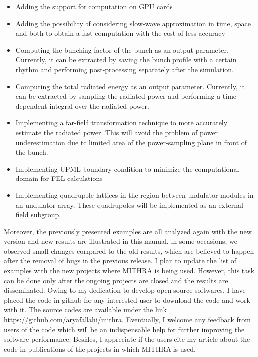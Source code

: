 \begin{itemize}
	\setlength{\parskip}{0pt}
	\setlength{\itemsep}{0pt plus 1pt}
	\item Adding the support for computation on GPU cards
	\item Adding the possibility of considering slow-wave approximation in time, space and both to obtain a fast computation with the cost of less accuracy
	\item Computing the bunching factor of the bunch as an output parameter. Currently, it can be extracted by saving the bunch profile with a certain rhythm and performing post-processing separately after the simulation.
	\item Computing the total radiated energy as an output parameter. Currently, it can be extracted by sampling the radiated power and performing a time-dependent integral over the radiated power.
	\item Implementing a far-field transformation technique to more accurately estimate the radiated power. This will avoid the problem of power underestimation due to limited area of the power-sampling plane
	 in front of the bunch.
	\item Implementing UPML boundary condition to minimize the computational domain for FEL calculations
	\item Implementing quadrupole lattices in the region between undulator modules in an undulator array. These quadrupoles will be implemented as an external field subgroup. 
\end{itemize}
%
Moreover, the previously presented examples are all analyzed again with the new version and new results are illustrated in this manual.
%
In some occasions, we observed small changes compared to the old results, which are believed to happen after the removal of bugs in the previous release.
%
I plan to update the list of examples with the new projects where MITHRA is being used.
%
However, this task can be done only after the ongoing projects are closed and the results are disseminated.
%
Owing to my dedication to develop open-source softwares, I have placed the code in github for any interested user to download the code and work with it.
%
The source codes are available under the link \href{https://github.com/aryafallahi/mithra}{https://github.com/aryafallahi/mithra}.
%
Eventually, I welcome any feedback from users of the code which will be an indispensable help for further improving the software performance.
%
Besides, I appreciate if the users cite my article about the code \cite{fallahi2018mithra} in publications of the projects in which MITHRA is used.